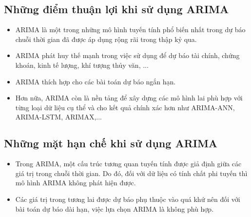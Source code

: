 \documentclass[12pt, a4paper,oneside]{book}
\theoremstyle{definition}
\begin{document}
\subsection*{Những điểm thuận lợi khi sử dụng ARIMA}
\begin{itemize}
	\item ARIMA là một trong những mô hình tuyến tính phổ biến nhất trong dự báo chuỗi thời gian đã được áp dụng rộng rãi trong thập kỷ qua.
	\item ARIMA phát huy thế mạnh trong việc sử dụng để dự báo tài chính, chứng khoán, kinh tế lượng, khí tượng thủy văn, ...
	\item ARIMA thích hợp cho các bài toán dự báo ngắn hạn.
	\item Hơn nữa, ARIMA còn là nền tảng để xây dựng các mô hình lai phù hợp với từng loại dữ liệu cụ thể và cho kết quả chính xác hơn như ARIMA-ANN, ARIMA-LSTM, ARIMAX,...
\end{itemize}
\subsection*{Những mặt hạn chế khi sử dụng ARIMA}
\begin{itemize}
	\item Trong ARIMA, một cấu trúc tương quan tuyến tính được giả định giữa các giá trị trong chuỗi thời gian. Do đó, đối với dữ liệu có tính chất phi tuyến thì mô hình ARIMA không phát hiện được. 
	\item Các giá trị trong tương lai được dự báo phụ thuộc vào quá khứ nên đối với bài toán dự báo dài hạn, việc lựa chọn ARIMA là không phù hợp.
\end{itemize}
\end{document}
